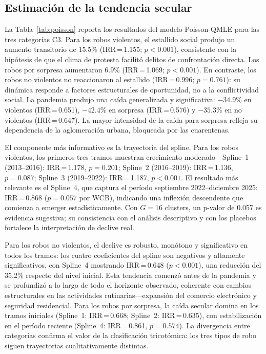 \documentclass[12pt,a4paper]{article}
\begin{document}
\subsection{Estimaci\'on de la tendencia secular}
\label{sub:inferencial}

La Tabla~\ref{tab:poisson} reporta los resultados del modelo Poisson-QMLE para las
tres categor\'ias C3. Para los robos violentos, el estallido social produjo un aumento
transitorio de 15.5\% (IRR\,=\,1.155; $p<0.001$), consistente con la hip\'otesis de
que el clima de protesta facilit\'o delitos de confrontaci\'on directa. Los robos por
sorpresa aumentaron 6.9\% (IRR\,=\,1.069; $p<0.001$). En contraste, los robos no
violentos no reaccionaron al estallido (IRR\,=\,0.996; $p=0.761$): su din\'amica
responde a factores estructurales de oportunidad, no a la conflictividad social. La
pandemia produjo una ca\'ida generalizada y significativa: $-34.9\%$ en violentos
(IRR\,=\,0.651), $-42.4\%$ en sorpresa (IRR\,=\,0.576) y $-35.3\%$ en no violentos
(IRR\,=\,0.647). La mayor intensidad de la ca\'ida para sorpresa refleja su dependencia
de la aglomeraci\'on urbana, bloqueada por las cuarentenas.

El componente m\'as informativo es la trayectoria del spline. Para los robos violentos,
los primeros tres tramos muestran crecimiento moderado---Spline~1 (2013--2016):
IRR\,=\,1.178, $p=0.201$; Spline~2 (2016--2019): IRR\,=\,1.136, $p=0.087$;
Spline~3 (2019--2022): IRR\,=\,1.187, $p<0.001$. El resultado m\'as relevante es el
Spline~4, que captura el per\'iodo septiembre 2022--diciembre 2025: IRR\,=\,0.868
($p=0.057$ por WCB), indicando una inflexi\'on descendente que comienza a emerger
estad\'isticamente. Con $G=16$ clusters, un p-valor de 0.057 es evidencia sugestiva;
su consistencia con el an\'alisis descriptivo y con los placebos fortalece la
interpretaci\'on de declive real.

Para los robos no violentos, el declive es robusto, mon\'otono y significativo en todos
los tramos: los cuatro coeficientes del spline son negativos y altamente significativos,
con Spline~4 mostrando IRR\,=\,0.648 ($p<0.001$), una reducci\'on del 35.2\% respecto
del nivel inicial. Esta tendencia comenz\'o antes de la pandemia y se profundiz\'o a lo
largo de todo el horizonte observado, coherente con cambios estructurales en las
actividades rutinarias---expansi\'on del comercio electr\'onico y seguridad residencial.
Para los robos por sorpresa, la ca\'ida secular domina en los tramos iniciales
(Spline~1: IRR\,=\,0.668; Spline~2: IRR\,=\,0.635), con estabilizaci\'on en el per\'iodo
reciente (Spline~4: IRR\,=\,0.861, $p=0.574$). La divergencia entre categor\'ias
confirma el valor de la clasificaci\'on tricot\'omica: los tres tipos de robo siguen
trayectorias cualitativamente distintas.
\end{document}
